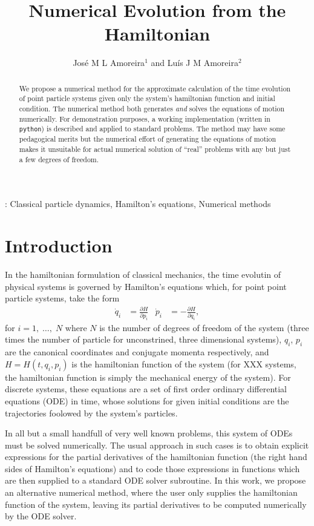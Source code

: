 \documentclass{iopart}
\newcommand{\pd}[2]{\frac{\partial#1}{\partial#2}}
\begin{document}
\title{Numerical Evolution from the Hamiltonian}
\author{José M L Amoreira$^1$ and Luís J M Amoreira$^2$}
\address{$^1$ Departamento de Física, Instituto Superior Técnico, Lisboa,
Portugal}
\address{$^2$ Departamento de Física, Universidade da Beira Interior, Covilhã,
Portugal}
\begin{abstract}
  We propose a numerical method for the approximate calculation of the time
  evolution of point particle systems given only the system's hamiltonian
  function and initial condition. The numerical method both generates \emph{and}
  solves the equations of motion numerically. For demonstration purposes, a
  working im\-ple\-men\-ta\-tion (written in \texttt{python}) is described and
  applied to standard problems. The method may have some pedagogical merits but
  the numerical effort of generating the equations of motion makes it unsuitable
  for actual numerical solution of ``real'' problems with any but just a few
  degrees of freedom.
\end{abstract}
: Classical particle dynamics,
Hamilton's equations,
Numerical methods

\submitto{\EJP}
\section{Introduction}
In the hamiltonian formulation of classical mechanics, the time evolutin of
physical systems is governed by Hamilton's equations which, for point point
particle systems, take the form
\begin{align}
  \dot q_i&=\pd{H}{p_i}&
  \dot p_i&=-\pd{H}{q_i},
\end{align}
for $i=1,\;\ldots,\;N$ where $N$ is the number of degrees of freedom of the
system (three times the number of particle for unconstrined, three dimensional
systems), $q_i$, $p_i$ are the canonical coordinates and conjugate momenta
respectively, and $H=H(t, q_i, p_i)$ is the hamiltonian function of the system
(for XXX systems, the hamiltonian function is simply the mechanical energy of
the system). For discrete systems, these equations are a set of first order
ordinary differential equations (ODE) in time, whose solutions for given initial
conditions are the trajectories foolowed by the system's particles.

In all but a small handfull of very well known problems, this system of ODEs
must be solved numerically. The usual approach in such cases is to obtain
explicit expressions for the partial derivatives of the hamiltonian function
(the right hand sides of Hamilton's equations) and to code those expressions in
functions which are then supplied to a standard ODE solver subroutine. In this
work, we propose an alternative numerical method, where the user only supplies
the hamiltonian function of the system, leaving its partial derivatives to be
computed numerically by the ODE solver.
\end{document}

